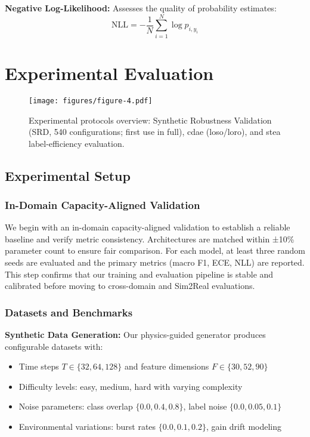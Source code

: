 \documentclass[journal]{IEEEtran}
\begin{document}
\textbf{Negative Log-Likelihood:} Assesses the quality of probability estimates:
\begin{equation}
\text{NLL} = -\frac{1}{N} \sum_{i=1}^{N} \log p_{i,y_i}
\end{equation}

\section{Experimental Evaluation}

\begin{figure}[t]
\centering
\texttt{[image: figures/figure-4.pdf]}
\caption{Experimental protocols overview: Synthetic Robustness Validation (SRD, 540 configurations; first use in full), \gls{cdae} (\gls{loso}/\gls{loro}), and \gls{stea} label-efficiency evaluation.}
\label{fig:protocols}
\end{figure}

\subsection{Experimental Setup}

\subsubsection{In-Domain Capacity-Aligned Validation}
We begin with an in-domain capacity-aligned validation to establish a reliable baseline and verify metric consistency. Architectures are matched within ±10\% parameter count to ensure fair comparison. For each model, at least three random seeds are evaluated and the primary metrics (macro F1, ECE, NLL) are reported. This step confirms that our training and evaluation pipeline is stable and calibrated before moving to cross-domain and Sim2Real evaluations.

\subsubsection{Datasets and Benchmarks}

\textbf{Synthetic Data Generation:} Our physics-guided generator produces configurable datasets with:
\begin{itemize}
\item Time steps $T \in \{32, 64, 128\}$ and feature dimensions $F \in \{30, 52, 90\}$
\item Difficulty levels: easy, medium, hard with varying complexity
\item Noise parameters: class overlap $\{0.0, 0.4, 0.8\}$, label noise $\{0.0, 0.05, 0.1\}$
\item Environmental variations: burst rates $\{0.0, 0.1, 0.2\}$, gain drift modeling
\end{itemize}
\end{document}
